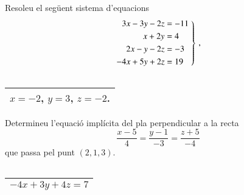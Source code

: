 \documentclass[11pt,catalan]{article}
\begin{document}
\begin{enunciat}
Resoleu el següent sistema d'equacions
\[
  \left.\aligned 3 x - 3 y - 2 z &= -11 \\ x + 2 y &= 4 \\ 2 x - y - 2 z &= -3 \\ - 4 x + 5 y + 2 z &= 19 \endaligned\;\right\}\,,
\]
\end{enunciat}

\begin{quadricula}
\begin{tabular}{|C{5cm}{0.5cm}|}
\hline
  \\
\hline
\end{tabular}
\end{quadricula}

\begin{solucio}
\begin{center}
\begin{tabular}{|C{5cm}{0.5cm}|}
\hline
$x=-2$, $y=3$, $z=-2$. \\
\hline
\end{tabular}
\end{center}
\end{solucio}


\begin{enunciat}
Determineu l'equació implícita del pla perpendicular a la recta 
\[
  \frac{x - 5}{4} = \frac{y - 1}{-3} = \frac{z + 5}{-4}
\]
que passa pel punt $(2,1,3)$.
\end{enunciat}

\begin{quadricula}
\begin{tabular}{|C{5cm}{0.5cm}|}
\hline
  \\
\hline
\end{tabular}
\end{quadricula}

\begin{solucio}
\begin{center}
\begin{tabular}{|C{5cm}{0.5cm}|}
\hline
$- 4 x + 3 y + 4 z = 7$ \\
\hline
\end{tabular}
\end{center}
\end{solucio}
\end{document}
